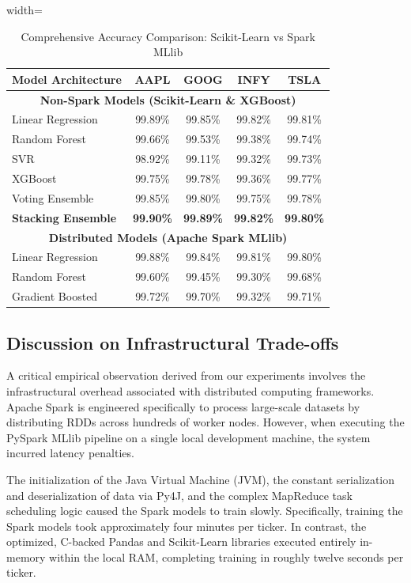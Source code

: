 \documentclass[conference]{IEEEtran}
\begin{document}
\begin{table}[htbp]
\centering
\caption{Comprehensive Accuracy Comparison: Scikit-Learn vs Spark MLlib}
\begin{adjustbox}{width=\linewidth}
\begin{tabular}{|l|c|c|c|c|}
\hline
\textbf{Model Architecture} & \textbf{AAPL} & \textbf{GOOG} & \textbf{INFY} & \textbf{TSLA} \\
\hline
\multicolumn{5}{|c|}{\textbf{Non-Spark Models (Scikit-Learn \& XGBoost)}} \\
\hline
Linear Regression & 99.89\% & 99.85\% & 99.82\% & 99.81\% \\
Random Forest & 99.66\% & 99.53\% & 99.38\% & 99.74\% \\
SVR & 98.92\% & 99.11\% & 99.32\% & 99.73\% \\
XGBoost & 99.75\% & 99.78\% & 99.36\% & 99.77\% \\
Voting Ensemble & 99.85\% & 99.80\% & 99.75\% & 99.78\% \\
\textbf{Stacking Ensemble} & \textbf{99.90\%} & \textbf{99.89\%} & \textbf{99.82\%} & \textbf{99.80\%} \\
\hline
\multicolumn{5}{|c|}{\textbf{Distributed Models (Apache Spark MLlib)}} \\
\hline
Linear Regression & 99.88\% & 99.84\% & 99.81\% & 99.80\% \\
Random Forest & 99.60\% & 99.45\% & 99.30\% & 99.68\% \\
Gradient Boosted & 99.72\% & 99.70\% & 99.32\% & 99.71\% \\
\hline
\end{tabular}
\end{adjustbox}
\label{tab_results}
\end{table}

\subsection{Discussion on Infrastructural Trade-offs}
A critical empirical observation derived from our experiments involves the infrastructural overhead associated with distributed computing frameworks. Apache Spark is engineered specifically to process large-scale datasets by distributing RDDs across hundreds of worker nodes. However, when executing the PySpark MLlib pipeline on a single local development machine, the system incurred latency penalties. 

The initialization of the Java Virtual Machine (JVM), the constant serialization and deserialization of data via Py4J, and the complex MapReduce task scheduling logic caused the Spark models to train slowly. Specifically, training the Spark models took approximately four minutes per ticker. In contrast, the optimized, C-backed Pandas and Scikit-Learn libraries executed entirely in-memory within the local RAM, completing training in roughly twelve seconds per ticker.
\end{document}

